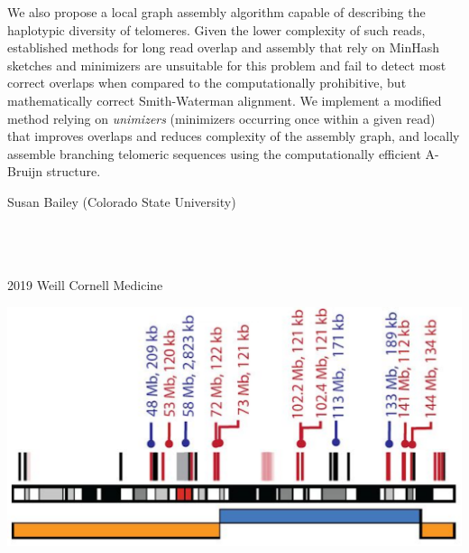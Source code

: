 \documentclass[paperwidth=42in,paperheight=47.75in,portrait]{baposter}
\begin{document}
\begin{poster}
{    We also propose a local graph assembly algorithm capable of describing the haplotypic diversity of telomeres. Given the lower complexity of such
    reads, established methods for long read overlap and assembly that rely on MinHash sketches and minimizers are unsuitable for this problem and fail
    to detect most correct overlaps when compared to the computationally prohibitive, but mathematically correct Smith-Waterman alignment.
    We implement a modified method relying on \textit{unimizers} (minimizers occurring once within a given read) that improves overlaps and reduces
    complexity of the assembly graph, and locally assemble branching telomeric sequences using the computationally efficient A-Bruijn structure.
}


{
    \begingroup
    \raggedright
    \AtNextBibliography{\footnotesize}
    \printbibliography[heading=none]
    \endgroup
}


{\small
    Susan Bailey (Colorado State University)
}


{\scriptsize
    ~\\~\\~\\
    \textcopyright{} 2019 Weill Cornell Medicine
}


{
    \begin{center}
        \includegraphics[width=\linewidth]{t2t.png}
    \end{center}
}



\end{poster}
\end{document}
